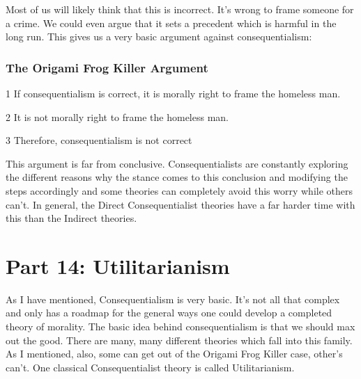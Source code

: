 Most of us will likely think that this is incorrect. It's wrong to frame someone for a crime. We could even argue that it sets a precedent which is harmful in the long run. This gives us a very basic argument against consequentialism: 
\subsection{The Origami Frog Killer Argument}

\begin{earg}
    \item[1] If consequentialism is correct, it is morally right to frame the homeless man.
    \item[2] It is not morally right to frame the homeless man.
    \item[3] Therefore, consequentialism is not correct
\end{earg}

This argument is far from conclusive. Consequentialists are constantly exploring the different reasons why the stance comes to this conclusion and modifying the steps accordingly and some theories can completely avoid this worry while others can't. In general, the Direct Consequentialist theories have a far harder time with this than the Indirect theories. 

\chapter{Part 14: Utilitarianism}

As I have mentioned, Consequentialism is very basic. It’s not all that complex and only has a roadmap for the general ways one could develop a completed theory of morality. The basic idea behind consequentialism is that we should max out the good. There are many, many different theories which fall into this family. As I mentioned, also, some can get out of the Origami Frog Killer case, other’s can’t. One classical Consequentialist theory is called Utilitarianism.

